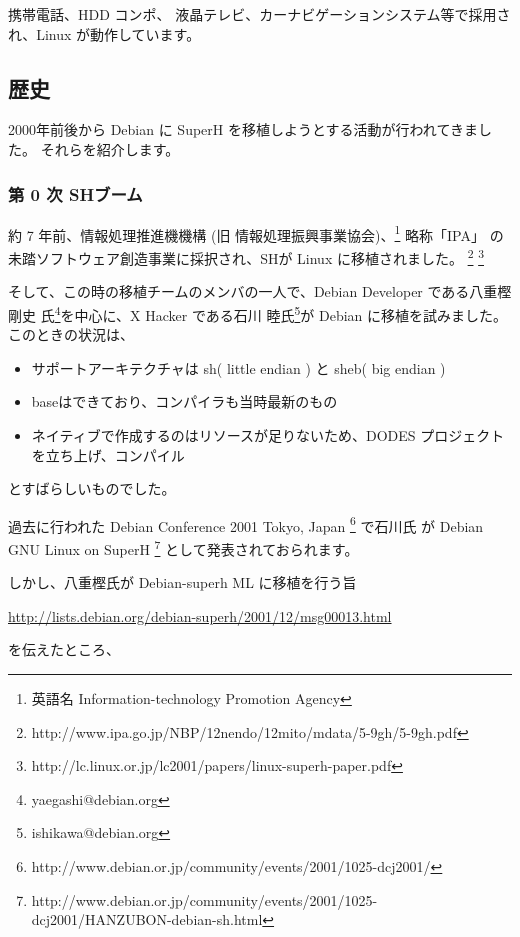\documentclass[mingoth,a4paper]{jsarticle}
\begin{document}
携帯電話、HDD コンポ、 液晶テレビ、カーナビゲーションシステム等で採用され、Linux が動作しています。

\subsection{歴史}

2000年前後から Debian に SuperH を移植しようとする活動が行われてきました。
それらを紹介します。

\subsubsection{第 0 次 SHブーム}
約 7 年前、情報処理推進機機構 (旧 情報処理振興事業協会)、\footnote{英語名 Information-technology Promotion Agency} 略称「IPA」
の未踏ソフトウェア創造事業に採択され、SHが Linux に移植されました。
\footnote{http://www.ipa.go.jp/NBP/12nendo/12mito/mdata/5-9gh/5-9gh.pdf}
\footnote{http://lc.linux.or.jp/lc2001/papers/linux-superh-paper.pdf}

そして、この時の移植チームのメンバの一人で、Debian Developer である八重樫 剛史 氏\footnote{yaegashi@debian.org}を中心に、X Hacker
である石川 睦氏\footnote{ishikawa@debian.org}が Debian に移植を試みました。
このときの状況は、

\begin{itemize}
 \item サポートアーキテクチャは sh( little endian ) と sheb( big endian )
 \item baseはできており、コンパイラも当時最新のもの
 \item ネイティブで作成するのはリソースが足りないため、DODES プロジェクトを立ち上げ、コンパイル
\end{itemize}

とすばらしいものでした。

過去に行われた Debian Conference 2001 Tokyo, Japan \footnote{http://www.debian.or.jp/community/events/2001/1025-dcj2001/}
で石川氏 が Debian GNU Linux on SuperH \footnote{ http://www.debian.or.jp/community/events/2001/1025-dcj2001/HANZUBON-debian-sh.html} として発表されておられます。



しかし、八重樫氏が Debian-superh ML に移植を行う旨

\url{http://lists.debian.org/debian-superh/2001/12/msg00013.html}

を伝えたところ、
\end{document}
